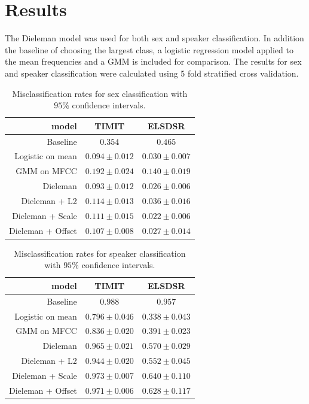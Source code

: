 \section{Results}

The Dieleman model was used for both sex and speaker classification. In addition the baseline of choosing the largest class, a logistic regression model applied to the mean frequencies and a GMM is included for comparison. The results for sex and speaker classification were calculated using 5 fold stratified cross validation.

\begin{table}[H]
\centering
\begin{tabular}{r|c|c}
model & TIMIT & ELSDSR \\ \hline
                    Baseline & $0.354$ & $0.465$ \\
                    Logistic on mean & $0.094 \pm 0.012$ & $0.030 \pm 0.007$ \\
                 GMM on MFCC & $0.192 \pm 0.024$ & $0.140 \pm 0.019$ \\
                    Dieleman & $0.093 \pm 0.012$ & $0.026 \pm 0.006$ \\
     Dieleman + L2 & $0.114 \pm 0.013$ & $0.036 \pm 0.016$ \\
  Dieleman + Scale & $0.111 \pm 0.015$ & $0.022 \pm 0.006$ \\
 Dieleman + Offset & $0.107 \pm 0.008$ & $0.027 \pm 0.014$ \\
\end{tabular}
\caption{Misclassification rates for sex classification with $95\%$ confidence intervals.}
\label{tab:results-sex}
\end{table}

\begin{table}[H]
\centering
\begin{tabular}{r|c|c}
model & TIMIT & ELSDSR \\ \hline
                    Baseline & $0.988$ & $0.957$ \\
                    Logistic on mean & $0.796 \pm 0.046$ & $0.338 \pm 0.043$ \\
                 GMM on MFCC & $0.836 \pm 0.020$ & $0.391 \pm 0.023$ \\
                    Dieleman & $0.965 \pm 0.021$ & $0.570 \pm 0.029$ \\
     Dieleman + L2 & $0.944 \pm 0.020$ & $0.552 \pm 0.045$ \\
  Dieleman + Scale & $0.973 \pm 0.007$ & $0.640 \pm 0.110$ \\
 Dieleman + Offset & $0.971 \pm 0.006$ & $0.628 \pm 0.117$ \\
\end{tabular}
\caption{Misclassification rates for speaker classification with $95\%$ confidence intervals.}
\label{tab:results-speaker}
\end{table}

